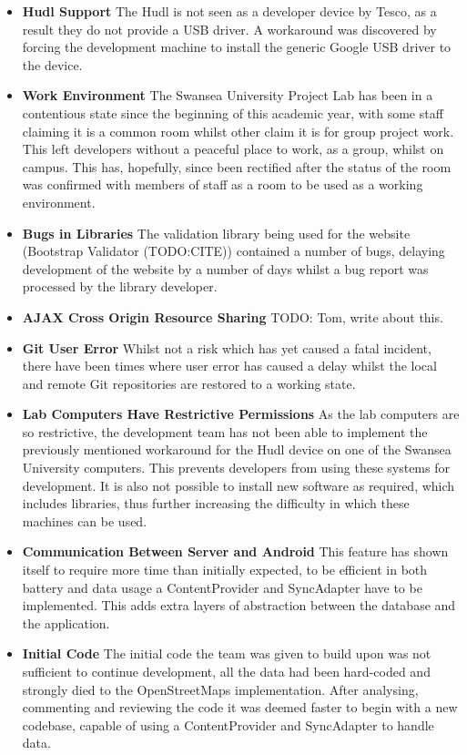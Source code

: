 \documentclass[11pt,a4paper]{article}
\begin{document}
\begin{itemize}
\item\textbf{Hudl Support} The Hudl is not seen as a developer device by Tesco, as a result they do not provide a USB driver. A workaround was discovered by forcing the development machine to install the generic Google USB driver to the device.
\item\textbf{Work Environment} The Swansea University Project Lab has been in a contentious state since the beginning of this academic year, with some staff claiming it is a common room whilst other claim it is for group project work. This left developers without a peaceful place to work, as a group, whilst on campus. This has, hopefully, since been rectified after the status of the room was confirmed with members of staff as a room to be used as a working environment.
\item\textbf{Bugs in Libraries} The validation library being used for the website (Bootstrap Validator (TODO:CITE)) contained a number of bugs, delaying development of the website by a number of days whilst a bug report was processed by the library developer.
\item\textbf{AJAX Cross Origin Resource Sharing} TODO: Tom, write about this.
\item\textbf{Git User Error} Whilst not a risk which has yet caused a fatal incident, there have been times where user error has caused a delay whilst the local and remote Git repositories are restored to a working state.
\item\textbf{Lab Computers Have Restrictive Permissions} As the lab computers are so restrictive, the development team has not been able to implement the previously mentioned workaround for the Hudl device on one of the Swansea University computers. This prevents developers from using these systems for development. It is also not possible to install new software as required, which includes libraries, thus further increasing the difficulty in which these machines can be used.
\item\textbf{Communication Between Server and Android} This feature has shown itself to require more time than initially expected, to be efficient in both battery and data usage a ContentProvider and SyncAdapter have to be implemented. This adds extra layers of abstraction between the database and the application.
\item\textbf{Initial Code} The initial code the team was given to build upon was not sufficient to continue development, all the data had been hard-coded and strongly died to the OpenStreetMaps implementation. After analysing, commenting and reviewing the code it was deemed faster to begin with a new codebase, capable of using a ContentProvider and SyncAdapter to handle data.
\end{itemize}
\end{document}
